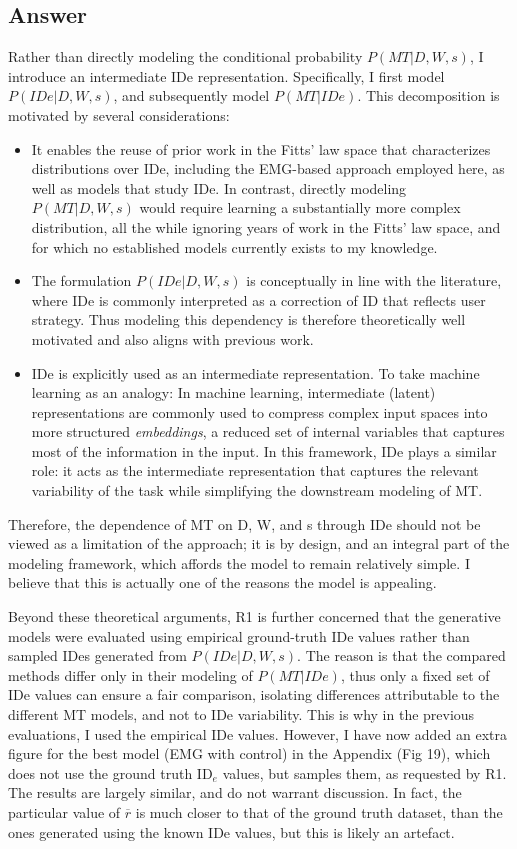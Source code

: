 \documentclass{article}
\begin{document}
\subsection*{Answer}
Rather than directly modeling the conditional probability $P(MT|D,W,s)$, I introduce an intermediate IDe representation. Specifically, I first model $P(IDe|D,W,s)$, and subsequently model $P(MT|IDe)$. This decomposition is motivated by several considerations:
\begin{itemize}
  \item It enables the reuse of prior work in the Fitts' law space that characterizes distributions over IDe, including the EMG-based approach employed here, as well as models that study IDe. In contrast, directly modeling $P(MT|D,W,s)$ would require learning a substantially more complex distribution, all the while ignoring years of work in the Fitts' law space, and for which no established models currently exists to my knowledge.
  \item The formulation $P(IDe | D, W, s)$ is conceptually in line with the literature, where IDe is commonly interpreted as a correction of ID that reflects user strategy. Thus modeling this dependency is therefore theoretically well motivated and also aligns with previous work.
  \item IDe is explicitly used as an intermediate representation. To take machine learning as an analogy: In machine learning, intermediate (latent) representations are commonly used to compress complex input spaces into more structured \textit{embeddings}, \ie a reduced set of internal variables that captures most of the information in the input. In this framework, IDe plays a similar role: it acts as the intermediate representation that captures the relevant variability of the task while simplifying the downstream modeling of MT.
\end{itemize}
Therefore, the dependence of MT on D, W, and s through IDe should not be viewed as a limitation of the approach; it is by design, and an integral part of the modeling framework, which affords the model to remain relatively simple. I believe that this is actually one of the reasons the model is appealing.

Beyond these theoretical arguments, R1 is further concerned that the generative models were evaluated using empirical ground-truth IDe values rather than sampled IDes generated from $P(IDe|D,W,s)$. The reason is that the compared methods differ only in their modeling of $P(MT|IDe)$, thus only a fixed set of IDe values can ensure a fair comparison, isolating differences attributable to the different MT models, and not to IDe variability. This is why in the previous evaluations, I used the empirical IDe values. However, I have now added an extra figure for the best model (EMG with control) in the Appendix (Fig 19), which does not use the ground truth ID$_e$ values, but samples them, as requested by R1. The results are largely similar, and do not warrant discussion. In fact, the particular value of $\overline{r}$ is much closer to that of the ground truth dataset, than the ones generated using the known IDe values, but this is likely an artefact.
\end{document}
